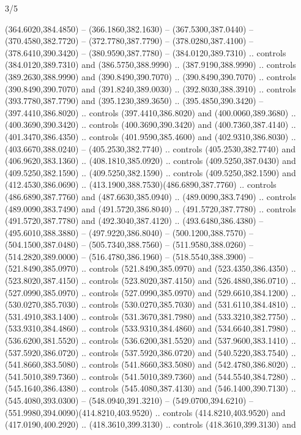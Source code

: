 \begin{flagdescription}{3/5}
\begin{scope}[shift={(0.5\flaglength,0.5\flagwidth)},scale=\flagwidth/510]
\begin{scope}[y=0.80pt, x=0.80pt, yscale=-1.06, xscale=1.06,yshift=-240pt,xshift=-400pt]
\begin{scope}[cm={{0.83333,0.0,0.0,0.83333,(154.64672,48.64761)}}]
  (364.6020,384.4850) -- (366.1860,382.1630) -- (367.5300,387.0440) --
  (370.4580,382.7720) -- (372.7780,387.7790) -- (378.0280,387.4100) --
  (378.6410,390.3420) -- (380.9590,387.7780) -- (384.0120,389.7310) .. controls
  (384.0120,389.7310) and (386.5750,388.9990) .. (387.9190,388.9990) .. controls
  (389.2630,388.9990) and (390.8490,390.7070) .. (390.8490,390.7070) .. controls
  (390.8490,390.7070) and (391.8240,389.0030) .. (392.8030,388.3910) .. controls
  (393.7780,387.7790) and (395.1230,389.3650) .. (395.4850,390.3420) --
  (397.4410,386.8020) .. controls (397.4410,386.8020) and (400.0060,389.3680) ..
  (400.3690,390.3420) .. controls (400.3690,390.3420) and (400.7360,387.4140) ..
  (401.3470,386.4350) .. controls (401.9590,385.4600) and (402.9310,386.8030) ..
  (403.6670,388.0240) -- (405.2530,382.7740) .. controls (405.2530,382.7740) and
  (406.9620,383.1360) .. (408.1810,385.0920) .. controls (409.5250,387.0430) and
  (409.5250,382.1590) .. (409.5250,382.1590) .. controls (409.5250,382.1590) and
  (412.4530,386.0690) .. (413.1900,388.7530)(486.6890,387.7760) .. controls
  (486.6890,387.7760) and (487.6630,385.0940) .. (489.0090,383.7490) .. controls
  (489.0090,383.7490) and (491.5720,386.8040) .. (491.5720,387.7780) .. controls
  (491.5720,387.7780) and (492.3040,387.4120) .. (493.6480,386.4380) --
  (495.6010,388.3880) -- (497.9220,386.8040) -- (500.1200,388.7570) --
  (504.1500,387.0480) -- (505.7340,388.7560) -- (511.9580,388.0260) --
  (514.2820,389.0000) -- (516.4780,386.1960) -- (518.5540,388.3900) --
  (521.8490,385.0970) .. controls (521.8490,385.0970) and (523.4350,386.4350) ..
  (523.8020,387.4150) .. controls (523.8020,387.4150) and (526.4880,386.0710) ..
  (527.0990,385.0970) .. controls (527.0990,385.0970) and (529.6610,384.1200) ..
  (530.0270,385.7030) .. controls (530.0270,385.7030) and (531.6110,384.4810) ..
  (531.4910,383.1400) .. controls (531.3670,381.7980) and (533.3210,382.7750) ..
  (533.9310,384.4860) .. controls (533.9310,384.4860) and (534.6640,381.7980) ..
  (536.6200,381.5520) .. controls (536.6200,381.5520) and (537.9600,383.1410) ..
  (537.5920,386.0720) .. controls (537.5920,386.0720) and (540.5220,383.7540) ..
  (541.8660,383.5080) .. controls (541.8660,383.5080) and (542.4780,386.8020) ..
  (541.5010,389.7360) .. controls (541.5010,389.7360) and (544.5540,384.7280) ..
  (545.1640,386.4380) .. controls (545.4080,387.4130) and (546.1400,390.7130) ..
  (545.4080,393.0300) -- (548.0940,391.3210) -- (549.0700,394.6210) --
  (551.9980,394.0090)(414.8210,403.9520) .. controls (414.8210,403.9520) and
  (417.0190,400.2920) .. (418.3610,399.3130) .. controls (418.3610,399.3130) and

\end{scope}
\end{scope}
\end{scope}
\end{flagdescription}
